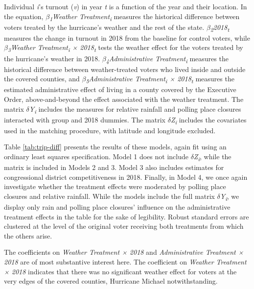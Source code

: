 \documentclass[
  12pt,
]{article}
\begin{document}
Individual \emph{i}'s turnout (\emph{v}) in year \emph{t} is a function of the year and their location. In the equation, \emph{\(\beta\)\textsubscript{1}Weather Treatment\textsubscript{i}} measures the historical difference between voters treated by the hurricane's weather and the rest of the state. \emph{\(\beta\)\textsubscript{2}2018\textsubscript{t}} measures the change in turnout in 2018 from the baseline for control voters, while \emph{\(\beta\)\textsubscript{3}Weather Treatment\textsubscript{i} × 2018\textsubscript{t}} tests the weather effect for the voters treated by the hurricane's weather in 2018. \emph{\(\beta\)\textsubscript{4}Administrative Treatment\textsubscript{i}} measures the historical difference between weather-treated voters who lived inside and outside the covered counties, and \emph{\(\beta\)\textsubscript{5}Administrative Treatment\textsubscript{i} × 2018\textsubscript{t}} measures the estimated administrative effect of living in a county covered by the Executive Order, above-and-beyond the effect associated with the weather treatment. The matrix \emph{\(\delta\)Y\textsubscript{i}} includes the measures for relative rainfall and polling place closures interacted with group and 2018 dummies. The matrix \emph{\(\delta\)Z\textsubscript{i}} includes the covariates used in the matching procedure, with latitude and longitude excluded.

Table \ref{tab:trip-diff} presents the results of these models, again fit using an ordinary least squares specification. Model 1 does not include \emph{\(\delta\)Z\textsubscript{i}}, while the matrix is included in Models 2 and 3. Model 3 also includes estimates for congressional district competitiveness in 2018. Finally, in Model 4, we once again investigate whether the treatment effects were moderated by polling place closures and relative rainfall. While the models include the full matrix \emph{\(\delta\)Y\textsubscript{i}}, we display only rain and polling place closures' influence on the administrative treatment effects in the table for the sake of legibility. Robust standard errors are clustered at the level of the original voter receiving both treatments from which the others arise.

\begin{singlespace}


\end{singlespace}

The coefficients on \emph{Weather Treatment × 2018} and \emph{Administrative Treatment × 2018} are of most substantive interest here. The coefficient on \emph{Weather Treatment × 2018} indicates that there was no significant weather effect for voters at the very edges of the covered counties, Hurricane Michael notwithstanding.
\end{document}
